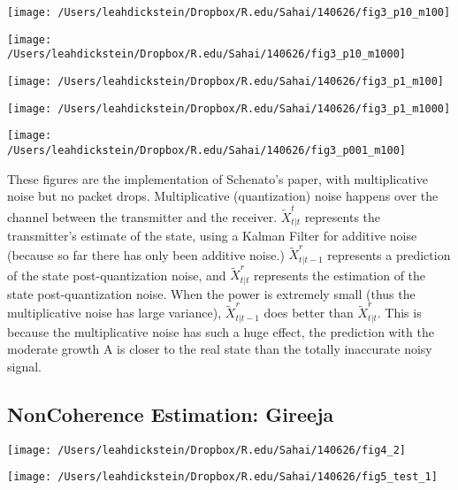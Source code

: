 \documentclass[leqno,twocolumn]{article}
\begin{document}
\begin{minipage}[c]{0.5\textwidth}
\texttt{[image: /Users/leahdickstein/Dropbox/R.edu/Sahai/140626/fig3\_p10\_m100]}
\end{minipage}
\begin{minipage}[c]{0.5\textwidth}
\texttt{[image: /Users/leahdickstein/Dropbox/R.edu/Sahai/140626/fig3\_p10\_m1000]}
\end{minipage}

\begin{minipage}[c]{0.5\textwidth}
\texttt{[image: /Users/leahdickstein/Dropbox/R.edu/Sahai/140626/fig3\_p1\_m100]}
\end{minipage}
\begin{minipage}[c]{0.5\textwidth}
\texttt{[image: /Users/leahdickstein/Dropbox/R.edu/Sahai/140626/fig3\_p1\_m1000]}
\end{minipage}

\begin{minipage}[c]{0.5\textwidth}
\texttt{[image: /Users/leahdickstein/Dropbox/R.edu/Sahai/140626/fig3\_p001\_m100]}
\end{minipage}
\begin{minipage}[b]{0.5\textwidth}
These figures are the implementation of Schenato's paper, with multiplicative noise but no packet drops. Multiplicative (quantization) noise happens over the channel between the transmitter and the receiver. $\tilde{X}^t_{t|t}$ represents the transmitter's estimate of the state, using a Kalman Filter for additive noise (because so far there has only been additive noise.) $\tilde{X}^r_{t|t-1}$ represents a prediction of the state post-quantization noise, and $\tilde{X}^r_{t|t}$ represents the estimation of the state post-quantization noise. When the power is extremely small (thus the multiplicative noise has large variance), $\tilde{X}^r_{t|t-1}$ does better than $\tilde{X}^r_{t|t}$. This is because the multiplicative noise has such a huge effect, the prediction with the moderate growth A is closer to the real state than the totally inaccurate noisy signal.
\end{minipage}

\subsection{NonCoherence Estimation: Gireeja}
\begin{minipage}[c]{0.5\textwidth}
\texttt{[image: /Users/leahdickstein/Dropbox/R.edu/Sahai/140626/fig4\_2]}
\end{minipage}
\begin{minipage}[c]{0.5\textwidth}
\texttt{[image: /Users/leahdickstein/Dropbox/R.edu/Sahai/140626/fig5\_test\_1]}
\end{minipage}
\end{document}
